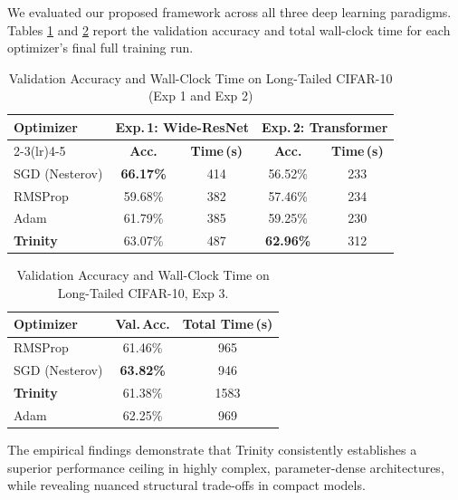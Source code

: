 \documentclass[conference]{IEEEtran}
\begin{document}
We evaluated our proposed framework across all three deep learning paradigms. Tables \ref{tab:highest_results} and \ref{tab:results_exp3} report the validation accuracy and total wall-clock time for each optimizer's final full training run. 

\begin{table}[htbp]
\centering
\caption{Validation Accuracy and Wall-Clock Time on Long-Tailed CIFAR-10 (Exp 1 and Exp 2)}
\label{tab:highest_results}
\setlength{\tabcolsep}{4pt}
\begin{tabular}{lcccc}
\toprule
\multirow{}{}{\textbf{Optimizer}}
  & \multicolumn{2}{c}{\textbf{Exp.\,1: Wide-ResNet}}
  & \multicolumn{2}{c}{\textbf{Exp.\,2: Transformer}} \\
\cmidrule(lr){2-3}\cmidrule(lr){4-5}
  & \textbf{Acc.} & \textbf{Time\,(s)}
  & \textbf{Acc.} & \textbf{Time\,(s)} \\
\midrule
SGD (Nesterov)      & \textbf{66.17\%} & 414 & 56.52\% & 233 \\
RMSProp             & 59.68\% & 382 & 57.46\% & 234 \\
Adam                & 61.79\% & 385 & 59.25\% & 230 \\
\textbf{Trinity}    & 63.07\% & 487 & \textbf{62.96\%} & 312 \\
\bottomrule
\end{tabular}
\end{table}

\begin{table}[htbp]
\centering
\caption{Validation Accuracy and Wall-Clock Time on Long-Tailed CIFAR-10, Exp 3.}
\label{tab:results_exp3}
\setlength{\tabcolsep}{5pt}
\begin{tabular}{lcc}
\toprule
\textbf{Optimizer} & \textbf{Val.\,Acc.} & \textbf{Total Time\,(s)} \\
\midrule
RMSProp             & 61.46\% & 965  \\
SGD (Nesterov)      & \textbf{63.82\%} & 946  \\
\textbf{Trinity}    & 61.38\% & 1583 \\
Adam                & 62.25\% & 969  \\
\bottomrule
\end{tabular}
\end{table}


The empirical findings demonstrate that Trinity consistently establishes a superior performance ceiling in highly complex, parameter-dense architectures, while revealing nuanced structural trade-offs in compact models.
\end{document}
